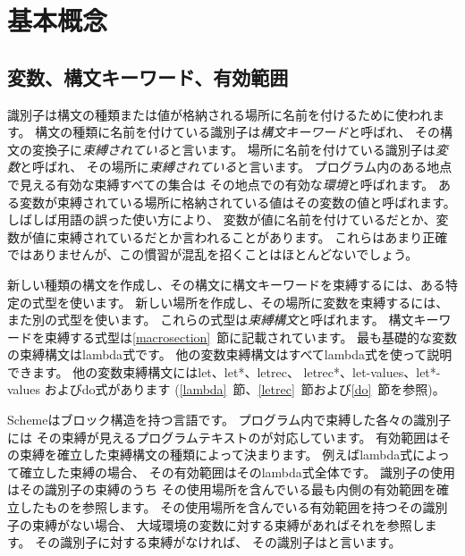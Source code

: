 \chapter{基本概念}
\label{basicchapter}

\section{変数、構文キーワード、有効範囲}
\label{specialformsection}
\label{variablesection}

識別子は構文の種類または値が格納される場所に名前を付けるために使われます。
構文の種類に名前を付けている識別子は{\em 構文キーワード}と呼ばれ、
その構文の変換子に{\em 束縛されている}と言います。
場所に名前を付けている識別子は{\em 変数}と呼ばれ、
その場所に{\em 束縛されている}と言います。
プログラム内のある地点で見える有効な束縛すべての集合は
その地点での有効な{\em 環境}と呼ばれます。
ある変数が束縛されている場所に格納されている値はその変数の値と呼ばれます。
しばしば用語の誤った使い方により、
変数が値に名前を付けているだとか、変数が値に束縛されているだとか言われることがあります。
これらはあまり正確ではありませんが、この慣習が混乱を招くことはほとんどないでしょう。

\vest 新しい種類の構文を作成し、その構文に構文キーワードを束縛するには、ある特定の式型を使います。
新しい場所を作成し、その場所に変数を束縛するには、また別の式型を使います。
これらの式型は{\em 束縛構文}と呼ばれます。
構文キーワードを束縛する式型は\ref{macrosection}~節に記載されています。
最も基礎的な変数の束縛構文は{\cf lambda}式です。
他の変数束縛構文はすべて{\cf lambda}式を使って説明できます。
他の変数束縛構文には{\cf let}、{\cf let*}、{\cf letrec}、
{\cf letrec*}、{\cf let-values}、{\cf let*-values}
および{\cf do}式があります
(\ref{lambda}~節、\ref{letrec}~節および\ref{do}~節を参照)。


\vest Schemeはブロック構造を持つ言語です。
プログラム内で束縛した各々の識別子には
その束縛が見えるプログラムテキストのが対応しています。
有効範囲はその束縛を確立した束縛構文の種類によって決まります。
例えば{\cf lambda}式によって確立した束縛の場合、
その有効範囲はその{\cf lambda}式全体です。
識別子の使用はその識別子の束縛のうち
その使用場所を含んでいる最も内側の有効範囲を確立したものを参照します。
その使用場所を含んでいる有効範囲を持つその識別子の束縛がない場合、
大域環境の変数に対する束縛があればそれを参照します。
その識別子に対する束縛がなければ、
その識別子はと言います。

